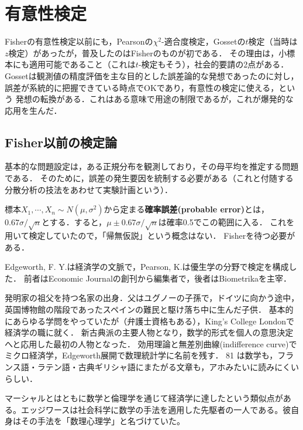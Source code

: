\documentclass[uplatex,dvipdfmx]{jsreport}
\begin{document}
\section{有意性検定}

\begin{tcolorbox}[colframe=ForestGreen, colback=ForestGreen!10!white,breakable,colbacktitle=ForestGreen!40!white,coltitle=black,fonttitle=\bfseries\sffamily,
title=]
    Fisherの有意性検定以前にも，Pearsonの$\chi^2$-適合度検定，Gossetの$t$検定（当時は$z$検定）があったが，普及したのはFisherのものが初である．
    その理由は，小標本にも適用可能であること（これは$t$-検定もそう），社会的要請の2点がある．
    Gossetは観測値の精度評価を主な目的とした誤差論的な発想であったのに対し，誤差が系統的に把握できている時点でOKであり，有意性の検定に使える，という
    発想の転換がある．これはある意味で用途の制限であるが，これが爆発的な応用を生んだ．
\end{tcolorbox}

\subsection{Fisher以前の検定論}

\begin{history}
    基本的な問題設定は，ある正規分布を観測しており，その母平均を推定する問題である．
    そのために，誤差の発生要因を統制する必要がある（これと付随する分散分析の技法をあわせて実験計画という）．

    標本$X_1,\cdots,X_n\sim N(\mu,\sigma^2)$から定まる\textbf{確率誤差(probable error)}とは，
    $0.67\sigma/\sqrt{n}$とする．すると，$\mu\pm0.67\sigma/\sqrt{n}$は確率0.5でこの範囲に入る．
    これを用いて検定していたので，「帰無仮説」という概念はない．
    Fisherを待つ必要がある．
\end{history}

Edgeworth, F. Y.は経済学の文脈で，Pearson, K.は優生学の分野で検定を構成した．
前者はEconomic Journalの創刊から編集者で，後者はBiometrikaを主宰．

\begin{history}
    発明家の祖父を持つ名家の出身．父はユグノーの子孫で，ドイツに向かう途中，英国博物館の階段であったスペインの難民と駆け落ち中に生んだ子供．
    基本的にあらゆる学問をやっていたが（弁護士資格もある），King's College Londonで経済学の職に就く．
    新古典派の主要人物となり，数学的形式を個人の意思決定へと応用した最初の人物となった．
    効用理論と無差別曲線(indifference curve)でミクロ経済学，Edgeworth展開で数理統計学に名前を残す．
    81 \cite{Edgeworth81}は数学も，フランス語・ラテン語・古典ギリシャ語にまたがる文章も，アホみたいに読みにくいらしい．

    マーシャルとはともに数学と倫理学を通じて経済学に達したという類似点がある。エッジワースは社会科学に数学の手法を適用した先駆者の一人である。彼自身はその手法を「数理心理学」と名づけていた。
\end{history}
\end{document}
